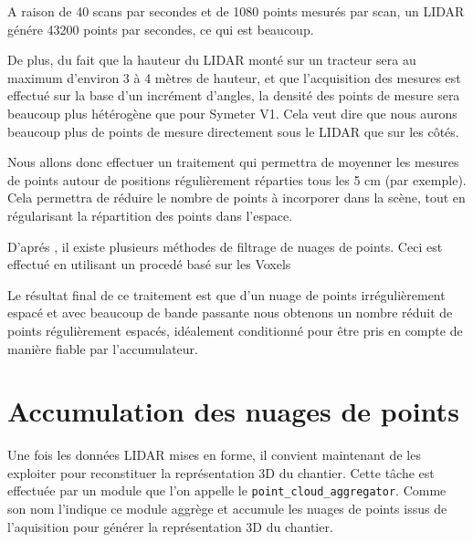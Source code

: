 \documentclass[12pt,a4paper]{report}
\begin{document}
		\para A raison de 40 scans par secondes et de 1080 points mesurés par scan, un LIDAR génére 43200 points par secondes, ce qui est beaucoup.
	
		\para De plus, du fait que la hauteur du LIDAR monté sur un tracteur sera au maximum d'environ 3 à 4 mètres de hauteur, et que l'acquisition des mesures est effectué sur la base d'un incrément d'angles, la densité des points de mesure sera beaucoup plus hétérogène que pour Symeter V1. Cela veut dire que nous aurons beaucoup plus de points de mesure directement sous le LIDAR que sur les côtés.
	
		\para Nous allons donc effectuer un traitement qui permettra de moyenner les mesures de points autour de positions régulièrement réparties tous les 5 cm (par exemple). Cela permettra de réduire le nombre de points à incorporer dans la scène,  tout en régularisant la répartition des points dans l'espace.
		
		\para D'aprés \cite{moreno_comparative_2016}, il existe plusieurs méthodes de filtrage de nuages de points. Ceci est effectué en utilisant un procedé basé sur les Voxels
	

		\para Le résultat final de ce traitement est que d'un nuage de points irrégulièrement espacé et avec beaucoup de bande passante nous obtenons un nombre réduit de points régulièrement espacés, idéalement conditionné pour être pris en compte de manière fiable par l'accumulateur.
	

		

		
	\section{Accumulation des nuages de points}
	
	Une fois les données LIDAR mises en forme, il convient maintenant de les exploiter pour reconstituer la représentation 3D du chantier. Cette tâche est effectuée par un module que l'on appelle le \verb|point_cloud_aggregator|. Comme son nom l'indique ce module aggrège et accumule les nuages de points issus de l'aquisition pour générer la représentation 3D du chantier.
	
\end{document}
